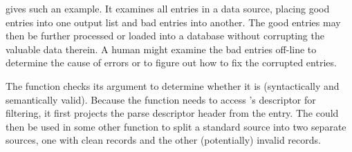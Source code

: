  gives such an example.  It examines all
entries in a \dibbler{} data source, placing good entries into one
output list and bad entries into another.  The good entries may then
be further processed or loaded into a database without corrupting the
valuable data therein.  A human might examine the bad entries off-line
to determine the cause of errors or to figure out how to fix the
corrupted entries.

The  function checks its argument  to
determine whether it is  (syntactically and semantically
valid).  Because the function needs to access 's descriptor for
filtering, it first projects the parse descriptor header from the
entry.  The  could then be used in some other function
to split a standard \dibbler{} source into two separate sources, one
with clean records and the other (potentially) invalid records.


